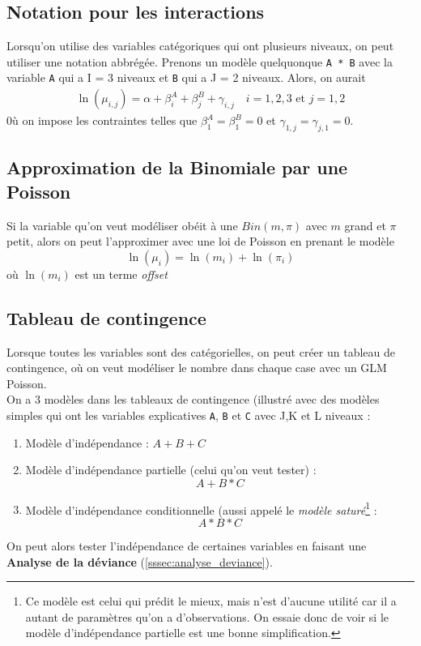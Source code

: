 \documentclass[10pt, french]{article}
\begin{document}
\begin{multicols*}{3}
\subsection*{Notation pour les interactions}
Lorsqu'on utilise des variables catégoriques qui ont plusieurs niveaux, on peut utiliser une notation abbrégée. Prenons un modèle quelquonque \verb=A * B= avec la variable \verb=A= qui a I = 3 niveaux et \verb=B= qui a J = 2 niveaux. Alors, on aurait
\begin{align*}
\ln (\mu_{i,j}) = \alpha + \beta_i^A + \beta_j^B + \gamma_{i,j} \quad i = 1,2,3 \text{ et } j = 1,2
\end{align*}
0ù on impose les contraintes telles que $\beta_1^A = \beta_1^B = 0$ et $\gamma_{1,j} = \gamma_{j,1} = 0$. 

\subsection*{Approximation de la Binomiale par une Poisson}
Si la variable qu'on veut modéliser obéit à une $Bin(m, \pi)$ avec $m$ grand et $\pi$ petit, alors on peut l'approximer avec une loi de Poisson en prenant le modèle
\[\ln(\mu_i) = \ln(m_i) + \ln(\pi_i) \]
où $\ln(m_i)$ est un terme \emph{offset}

\subsection*{Tableau de contingence}
Lorsque toutes les variables sont des catégorielles, on peut créer un tableau de contingence, où on veut modéliser le nombre dans chaque case avec un GLM Poisson. \\

On a 3 modèles dans les tableaux de contingence (illustré avec des modèles simples qui ont les variables explicatives \verb=A=, \verb=B= et \verb=C= avec J,K et L niveaux  : 
\begin{enumerate}[label=\faAngleRight]
\item Modèle d'indépendance : $A + B + C$

\item Modèle d'indépendance partielle (celui qu'on veut tester) : 
\[A + B * C\]

\item Modèle d'indépendance conditionnelle (aussi appelé le \emph{modèle saturé}\footnote{Ce modèle est celui qui prédit le mieux, mais n'est d'aucune utilité car il a autant de paramètres qu'on a d'observations. On essaie donc de voir si le modèle d'indépendance partielle est une bonne simplification.} : 
\[A * B * C\]
\end{enumerate}
On peut alors tester l'indépendance de certaines variables en faisant une \textbf{Analyse de la déviance} (\autoref{sssec:analyse_deviance}).



\end{multicols*}
\end{document}
